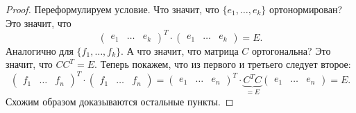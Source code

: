 \begin{proof}
    Переформулируем условие. Что значит, что $\{e_1, \ldots, e_k\}$ ортонормирован? Это значит, что
    $$
    \begin{pmatrix}
        e_1 & \ldots & e_k
    \end{pmatrix}^T \cdot
    \begin{pmatrix}
        e_1 & \ldots & e_k
    \end{pmatrix} = E.
    $$
    Аналогично для $\{f_1, \ldots, f_k\}$. А что значит, что матрица $C$ ортогональна? Это значит, что $CC^T = E$. Теперь покажем, что из первого и третьего следует второе:
    $$
    \begin{pmatrix}
        f_1 & \ldots & f_n
    \end{pmatrix}^T \cdot
    \begin{pmatrix}
        f_1 & \ldots & f_n
    \end{pmatrix} = 
    \begin{pmatrix}
        e_1 & \ldots & e_n
    \end{pmatrix}^T \cdot \underbrace{C^TC}_{{} = E}
    \begin{pmatrix}
        e_1 & \ldots & e_n
    \end{pmatrix} = E.
    $$
    Схожим образом доказываются остальные пункты.
\end{proof}


